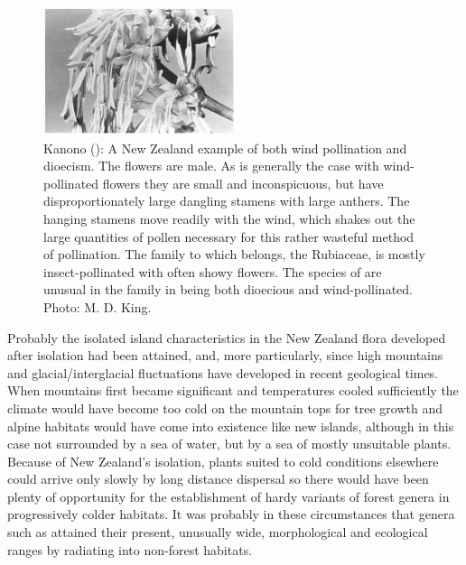 \begin{figure}
	\includegraphics[width=0.5\textwidth]{graphics/figure5kanono.jpg}
	\centering
	\caption[Kanono: A New Zealand example of both wind pollination and dioecism]{Kanono (): A New Zealand example of both wind pollination and dioecism.
    The flowers are male.
    As is generally the case with wind-pollinated flowers they are small and inconspicuous, but have disproportionately large dangling stamens with large anthers.
    The hanging stamens move readily with the wind, which shakes out the large quantities of pollen necessary for this rather wasteful method of pollination.
    The family to which  belongs, the Rubiaceae, is mostly insect-pollinated with often showy flowers.
    The species of  are unusual in the family in being both dioecious and wind-pollinated.
    Photo: M. D. King.}
	\label{fig:5kanono}
\end{figure}

Probably the isolated island characteristics in the New Zealand flora developed after isolation had been attained, and, more particularly, since high mountains and glacial/interglacial fluctuations have developed in recent geological times.
When mountains first became significant and temperatures cooled sufficiently the climate would have become too cold on the mountain tops for tree growth and alpine habitats would have come into existence like new islands, although in this case not surrounded by a sea of water, but by a sea of mostly unsuitable plants.
Because of New Zealand's isolation, plants suited to cold conditions elsewhere could arrive only slowly by long distance dispersal so there would have been plenty of opportunity for the establishment of hardy variants of forest genera in progressively colder habitats.
It was probably in these circumstances that genera such as  attained their present, unusually wide, morphological and ecological ranges by radiating into non-forest habitats.

